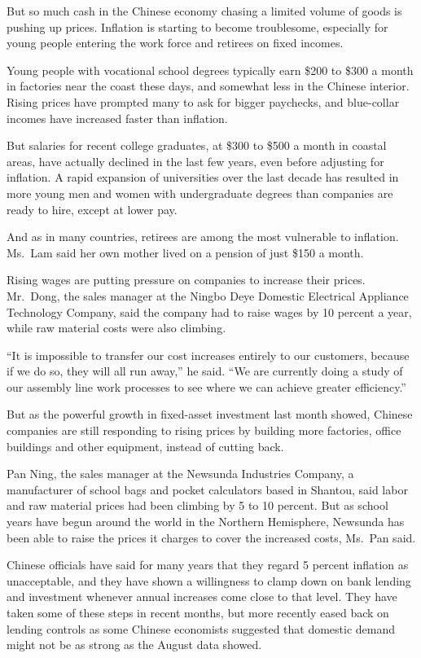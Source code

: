 ﻿\documentclass[12pt]{article}
\begin{document}
But so much cash in the Chinese economy chasing a limited volume of goods is pushing up prices.
Inflation is starting to become troublesome, especially for young people entering the work force and
retirees on fixed incomes.

Young people with vocational school degrees typically earn \$200 to \$300 a month in factories near
the coast these days, and somewhat less in the Chinese interior. Rising prices have prompted many to
ask for bigger paychecks, and blue-collar incomes have increased faster than inflation.

But salaries for recent college graduates, at \$300 to \$500 a month in coastal areas, have actually
declined in the last few years, even before adjusting for inflation. A rapid expansion of
universities over the last decade has resulted in more young men and women with undergraduate
degrees than companies are ready to hire, except at lower pay.

And as in many countries, retirees are among the most vulnerable to inflation. Ms.~Lam said her own
mother lived on a pension of just \$150 a month.

Rising wages are putting pressure on companies to increase their prices. Mr.~Dong, the sales manager
at the Ningbo Deye Domestic Electrical Appliance Technology Company, said the company had to raise
wages by 10 percent a year, while raw material costs were also climbing.

``It is impossible to transfer our cost increases entirely to our customers, because if we do so,
they will all run away,'' he said. ``We are currently doing a study of our assembly line work
processes to see where we can achieve greater efficiency.''

But as the powerful growth in fixed-asset investment last month showed, Chinese companies are still
responding to rising prices by building more factories, office buildings and other equipment,
instead of cutting back.

Pan Ning, the sales manager at the Newsunda Industries Company, a manufacturer of school bags and
pocket calculators based in Shantou, said labor and raw material prices had been climbing by 5 to 10
percent. But as school years have begun around the world in the Northern Hemisphere, Newsunda has
been able to raise the prices it charges to cover the increased costs, Ms.~Pan said.

Chinese officials have said for many years that they regard 5 percent inflation as unacceptable, and
they have shown a willingness to clamp down on bank lending and investment whenever annual increases
come close to that level. They have taken some of these steps in recent months, but more recently
eased back on lending controls as some Chinese economists suggested that domestic demand might not
be as strong as the August data showed.
\end{document}
